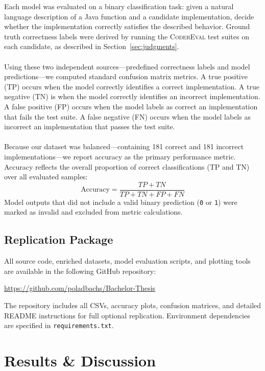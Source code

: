 \documentclass[a4paper]{usiinfbachelorproject}
\begin{document}
Each model was evaluated on a binary classification task: given a natural language description of a Java function and a candidate implementation, decide whether the implementation correctly satisfies the described behavior. Ground truth correctness labels were derived by running the \textsc{CoderEval} test suites on each candidate, as described in Section~\ref{sec:judgments}. \\
\\
Using these two independent sources—predefined correctness labels and model predictions—we computed standard confusion matrix metrics. A true positive (TP) occurs when the model correctly identifies a correct implementation. A true negative (TN) is when the model correctly identifies an incorrect implementation. A false positive (FP) occurs when the model labels as correct an implementation that fails the test suite. A false negative (FN) occurs when the model labels as incorrect an implementation that passes the test suite.\\
\\[2pt]
Because our dataset was balanced—containing 181 correct and 181 incorrect implementations—we report accuracy as the primary performance metric. Accuracy reflects the overall proportion of correct classifications (TP and TN) over all evaluated samples:
\[
\text{Accuracy} = \frac{TP + TN}{TP + TN + FP + FN}
\]
Model outputs that did not include a valid binary prediction (\texttt{0} or \texttt{1}) were marked as invalid and excluded from metric calculations.


\subsection{Replication Package}\label{sec:replication}
All source code, enriched datasets, model evaluation scripts, and plotting tools are available in the following GitHub repository:
\begin{center}
\url{https://github.com/poladbachs/Bachelor-Thesis}
\end{center}
The repository includes all CSVs, accuracy plots, confusion matrices, and detailed README instructions for full optional replication. Environment dependencies are specified in \texttt{requirements.txt}.

\section{Results \& Discussion}\label{sec:results}
\end{document}
